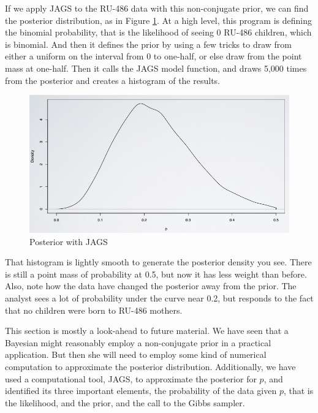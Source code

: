 \documentclass[]{book}
\theoremstyle{definition}
\theoremstyle{definition}
\theoremstyle{definition}
\theoremstyle{remark}
\begin{document}
If we apply JAGS to the RU-486 data with this non-conjugate prior, we
can find the posterior distribution, as in Figure
\ref{fig:JAGS-screenshot}. At a high level, this program is defining the
binomial probability, that is the likelihood of seeing 0 RU-486
children, which is binomial. And then it defines the prior by using a
few tricks to draw from either a uniform on the interval from 0 to
one-half, or else draw from the point mass at one-half. Then it calls
the JAGS model function, and draws 5,000 times from the posterior and
creates a histogram of the results.

\begin{figure}

{\centering \includegraphics{JAGS_screenshot} 

}

\caption{Posterior with JAGS}\label{fig:JAGS-screenshot}
\end{figure}

That histogram is lightly smooth to generate the posterior density you
see. There is still a point mass of probability at 0.5, but now it has
less weight than before. Also, note how the data have changed the
posterior away from the prior. The analyst sees a lot of probability
under the curve near 0.2, but responds to the fact that no children were
born to RU-486 mothers.

This section is mostly a look-ahead to future material. We have seen
that a Bayesian might reasonably employ a non-conjugate prior in a
practical application. But then she will need to employ some kind of
numerical computation to approximate the posterior distribution.
Additionally, we have used a computational tool, JAGS, to approximate
the posterior for \(p\), and identified its three important elements,
the probability of the data given \(p\), that is the likelihood, and the
prior, and the call to the Gibbs sampler.
\end{document}
